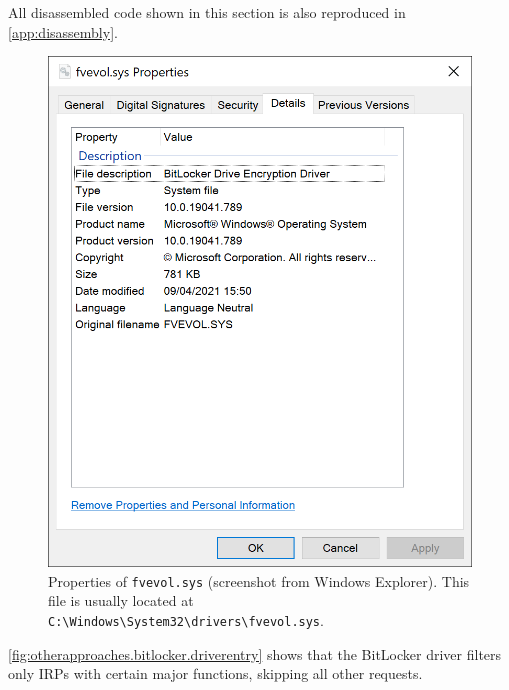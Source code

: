 All disassembled code shown in this section is also reproduced in \autoref{app:disassembly}.
%

\begin{figure}[htb!]
	\center
	\includegraphics[scale=0.7]{../img/otherapproaches.bitlocker.fvevol.png}
	\caption[
		Properties of \texttt{fvevol.sys}
	]{
		Properties of \texttt{fvevol.sys} (screenshot from Windows Explorer). This file is usually located at \texttt{C:\textbackslash Windows\textbackslash System32\textbackslash drivers\textbackslash fvevol.sys}.
	}
	\label{fig:otherapproaches.bitlocker.fvevol}
\end{figure}

\autoref{fig:otherapproaches.bitlocker.driverentry} shows that the BitLocker driver filters only IRPs with certain major functions, skipping all other requests.

